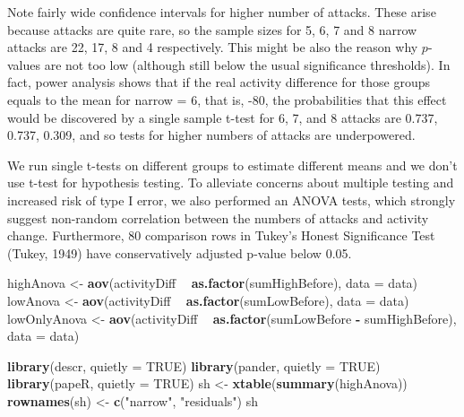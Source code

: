 \documentclass[10pt,]{scrartcl}
\newenvironment{Shaded}{\begin{snugshade}}{\end{snugshade}}
\newcommand{\KeywordTok}[1]{\textcolor[rgb]{0.13,0.29,0.53}{\textbf{#1}}}
\newcommand{\DataTypeTok}[1]{\textcolor[rgb]{0.13,0.29,0.53}{#1}}
\newcommand{\StringTok}[1]{\textcolor[rgb]{0.31,0.60,0.02}{#1}}
\newcommand{\OtherTok}[1]{\textcolor[rgb]{0.56,0.35,0.01}{#1}}
\newcommand{\OperatorTok}[1]{\textcolor[rgb]{0.81,0.36,0.00}{\textbf{#1}}}
\newcommand{\NormalTok}[1]{#1}
\begin{document}
\normalsize 

Note fairly wide confidence intervals for higher number of attacks.
These arise because attacks are quite rare, so the sample sizes for 5,
6, 7 and 8 narrow attacks are 22, 17, 8 and 4 respectively. This might
be also the reason why \(p\)-values are not too low (although still
below the usual significance thresholds). In fact, power analysis shows
that if the real activity difference for those groups equals to the mean
for \textsf{narrow = 6}, that is, -80, the probabilities that this
effect would be discovered by a single sample t-test for 6, 7, and 8
attacks are 0.737, 0.737, 0.309, and so tests for higher numbers of
attacks are underpowered.

We run single t-tests on different groups to estimate different means
and we don't use t-test for hypothesis testing. To alleviate concerns
about multiple testing and increased risk of type I error, we also
performed an ANOVA tests, which strongly suggest non-random correlation
between the numbers of attacks and activity change. Furthermore, 80
comparison rows in Tukey's Honest Significance Test (Tukey, 1949) have
conservatively adjusted p-value below 0.05.

\footnotesize

\begin{Shaded}
\begin{Highlighting}[]
\NormalTok{highAnova <-}\StringTok{ }\KeywordTok{aov}\NormalTok{(activityDiff }\OperatorTok{~}\StringTok{ }\KeywordTok{as.factor}\NormalTok{(sumHighBefore), }\DataTypeTok{data =}\NormalTok{ data)}
\NormalTok{lowAnova <-}\StringTok{ }\KeywordTok{aov}\NormalTok{(activityDiff }\OperatorTok{~}\StringTok{ }\KeywordTok{as.factor}\NormalTok{(sumLowBefore), }\DataTypeTok{data =}\NormalTok{ data)}
\NormalTok{lowOnlyAnova <-}\StringTok{ }\KeywordTok{aov}\NormalTok{(activityDiff }\OperatorTok{~}\StringTok{ }\KeywordTok{as.factor}\NormalTok{(sumLowBefore }\OperatorTok{-}\StringTok{ }\NormalTok{sumHighBefore),}
    \DataTypeTok{data =}\NormalTok{ data)}

\KeywordTok{library}\NormalTok{(descr, }\DataTypeTok{quietly =} \OtherTok{TRUE}\NormalTok{)}
\KeywordTok{library}\NormalTok{(pander, }\DataTypeTok{quietly =} \OtherTok{TRUE}\NormalTok{)}
\KeywordTok{library}\NormalTok{(papeR, }\DataTypeTok{quietly =} \OtherTok{TRUE}\NormalTok{)}
\NormalTok{sh <-}\StringTok{ }\KeywordTok{xtable}\NormalTok{(}\KeywordTok{summary}\NormalTok{(highAnova))}
\KeywordTok{rownames}\NormalTok{(sh) <-}\StringTok{ }\KeywordTok{c}\NormalTok{(}\StringTok{"narrow"}\NormalTok{, }\StringTok{"residuals"}\NormalTok{)}
\NormalTok{sh}
\end{Highlighting}
\end{Shaded}
\end{document}

